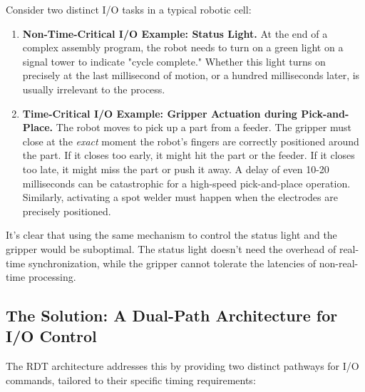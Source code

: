 Consider two distinct I/O tasks in a typical robotic cell:
\begin{enumerate}
    \item \textbf{Non-Time-Critical I/O Example: Status Light.} At the end of a complex assembly program, the robot needs to turn on a green light on a signal tower to indicate "cycle complete." Whether this light turns on precisely at the last millisecond of motion, or a hundred milliseconds later, is usually irrelevant to the process.
    \item \textbf{Time-Critical I/O Example: Gripper Actuation during Pick-and-Place.} The robot moves to pick up a part from a feeder. The gripper must close at the \textit{exact} moment the robot's fingers are correctly positioned around the part. If it closes too early, it might hit the part or the feeder. If it closes too late, it might miss the part or push it away. A delay of even 10-20 milliseconds can be catastrophic for a high-speed pick-and-place operation. Similarly, activating a spot welder must happen when the electrodes are precisely positioned.
\end{enumerate}

It's clear that using the same mechanism to control the status light and the gripper would be suboptimal. The status light doesn't need the overhead of real-time synchronization, while the gripper cannot tolerate the latencies of non-real-time processing.

\subsection{The Solution: A Dual-Path Architecture for I/O Control}
\label{subsec:dual_path_io_solution}

The RDT architecture addresses this by providing two distinct pathways for I/O commands, tailored to their specific timing requirements:

